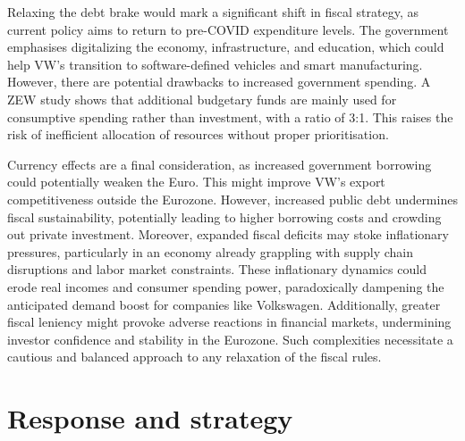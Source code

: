 \documentclass[10pt]{article}
\begin{document}

Relaxing the debt brake would mark a significant shift in fiscal strategy, as current policy aims to return to pre-COVID expenditure levels. The government emphasises digitalizing the economy, infrastructure, and education, which could help VW's transition to software-defined vehicles and smart manufacturing. However, there are potential drawbacks to increased government spending. A ZEW study shows that additional budgetary funds are mainly used for consumptive spending rather than investment, with a ratio of 3:1. This raises the risk of inefficient allocation of resources without proper prioritisation\autocite{PressReleaseEasing}.

Currency effects are a final consideration, as increased government borrowing could potentially weaken the Euro. This might improve VW's export competitiveness outside the Eurozone. However, increased public debt undermines fiscal sustainability, potentially leading to higher borrowing costs and crowding out private investment. Moreover, expanded fiscal deficits may stoke inflationary pressures, particularly in an economy already grappling with supply chain disruptions and labor market constraints. These inflationary dynamics could erode real incomes and consumer spending power, paradoxically dampening the anticipated demand boost for companies like Volkswagen. Additionally, greater fiscal leniency might provoke adverse reactions in financial markets, undermining investor confidence and stability in the Eurozone. Such complexities necessitate a cautious and balanced approach to any relaxation of the fiscal rules.

\section{Response and strategy}
\end{document}

